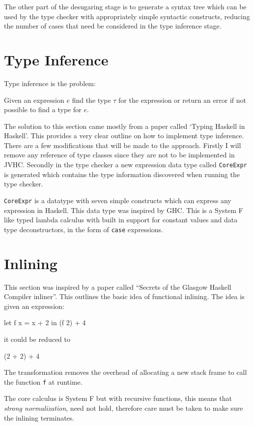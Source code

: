 \documentclass[float=false, crop=false]{standalone}
\begin{document}
The other part of the desugaring stage is to generate a syntax tree which can be used by the type checker
with appropriately simple syntactic constructs, reducing the number of cases that need
be considered in the type inference stage.

\section{Type Inference}

Type inference is the problem:
\begin{displayquote}
Given an expression $e$ find the type $\tau$ for the expression or return an error if not possible to
find a type for $e$.
\end{displayquote}
The solution to this section came mostly from a paper called `Typing Haskell in Haskell'\cite{thih-paper}. 
This provides a very clear outline on how to implement type inference. 
There are a few modifications that will be made to the approach.
Firstly I will remove any reference of type classes since they are not to be implemented in JVHC.
Secondly in the type checker a new expression data type called \texttt{CoreExpr} 
is generated which contains the type information discovered when running the type checker.

\texttt{CoreExpr} is a datatype with seven simple constructs which can express any expression in Haskell.
This data type was inspired by GHC\cite{typedcorelink}. This is a System F like typed lambda calculus with
built in support for constant values and data type deconstructors, in the form of \texttt{case} expressions.

\section{Inlining}

This section was inspired by a paper called ``Secrets of the 
Glasgow Haskell Compiler inliner''\cite{ghc-inliner}. This outlines the basic idea of functional 
inlining. The idea is given an expression:
\begin{HaskellLst}
let f x = x + 2 in 
  (f 2) + 4
\end{HaskellLst}
it could be reduced to
\begin{HaskellLst}
(2 + 2) + 4
\end{HaskellLst}
The transformation removes the overhead of allocating a new stack frame to call 
the function \texttt{f} at runtime.

The core calculus is System F but with recursive functions, 
this means that \textit{strong normalization}, 
need not hold, therefore care must be taken to make sure the inlining terminates.
\end{document}

